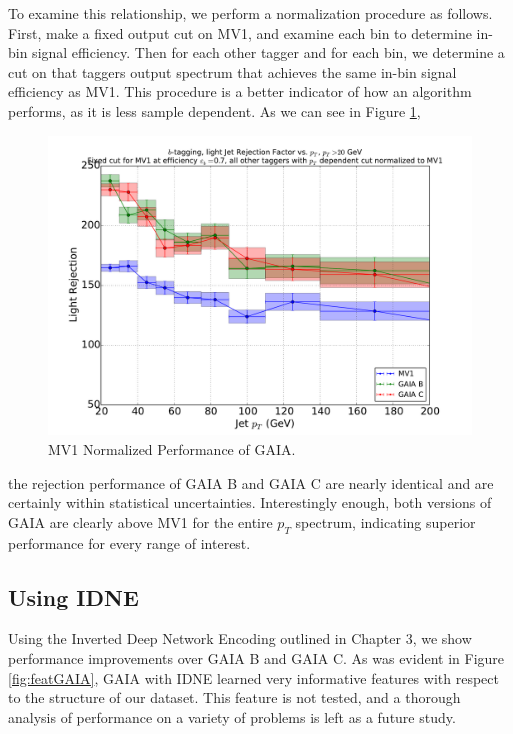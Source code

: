 To examine this relationship, we perform a normalization procedure as follows. First, make a fixed output cut on MV1, and examine each \pt bin to determine in-bin signal efficiency. Then for each other tagger and for each \pt bin, we determine a cut on that taggers output spectrum  that achieves the same in-bin signal efficiency as MV1. This procedure is a better indicator of how an algorithm performs, as it is less sample dependent. As we can see in Figure \ref{fig:urejmv1norm70}, 
\begin{figure}
\includegraphics[width=\textwidth]{figures/btag/u_rej_mv1normalized_pTdep_70pct.pdf}
\caption[The ATLAS detector]{MV1 Normalized Performance of GAIA.
\label{fig:urejmv1norm70}}
\end{figure}
the rejection performance of GAIA B and GAIA C are nearly identical and are certainly within statistical uncertainties. Interestingly enough, both versions of GAIA are clearly above MV1 for the entire $p_T$ spectrum, indicating superior performance for every \pt range of interest. 

\subsection{Using IDNE}


Using the Inverted Deep Network Encoding outlined in Chapter 3, we show performance improvements over GAIA B and GAIA C. As was evident in Figure \ref{fig:featGAIA}, GAIA with IDNE learned very informative features with respect to the structure of our dataset. This feature is not tested, and a thorough analysis of performance on a variety of problems is left as a future study. 

